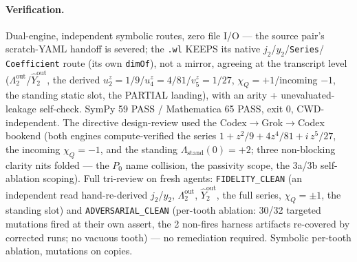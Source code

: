 \paragraph{Verification.}
Dual-engine, independent symbolic routes, zero file I/O --- the source pair's scratch-YAML
handoff is severed; the \texttt{.wl} KEEPS its native \(j_2\)/\(y_2\)/\texttt{Series}/
\texttt{Coefficient} route (its own \texttt{dimOf}), not a mirror, agreeing at the transcript
level (\(\Lambda_2^{\mathrm{out}}\)/\(\hat Y_2^{\mathrm{out}}\), the derived
\(u_2^z=1/9\)/\(u_4^z=4/81\)/\(v_5^z=1/27\), \(\chi_Q=+1\)/incoming \(-1\), the standing static
slot, the PARTIAL landing), with an arity + unevaluated-leakage self-check. SymPy 59 PASS /
Mathematica 65 PASS, exit 0, CWD-independent. The directive design-review used the
Codex\(\to\)Grok\(\to\)Codex bookend (both engines compute-verified the series
\(1+z^2/9+4z^4/81+i\,z^5/27\), the incoming \(\chi_Q=-1\), and the standing
\(\Lambda_{\mathrm{stand}}(0)=+2\); three non-blocking clarity nits folded --- the \(P_0\)
name collision, the passivity scope, the 3a/3b self-ablation scoping). Full tri-review on fresh
agents: \texttt{FIDELITY\_CLEAN} (an independent read hand-re-derived \(j_2\)/\(y_2\),
\(\Lambda_2^{\mathrm{out}}\), \(\hat Y_2^{\mathrm{out}}\), the full series, \(\chi_Q=\pm1\), the
standing slot) and \texttt{ADVERSARIAL\_CLEAN} (per-tooth ablation: 30/32 targeted mutations
fired at their own assert, the 2 non-fires harness artifacts re-covered by corrected runs; no
vacuous tooth) --- no remediation required. Symbolic per-tooth ablation, mutations on copies.
